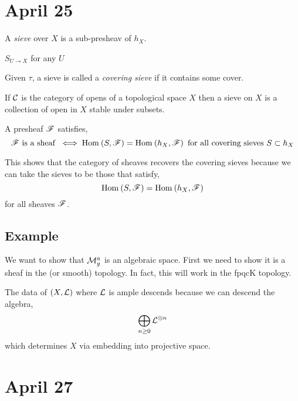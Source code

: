 \documentclass[12pt]{article}
\begin{document}
\section{April 25}

\begin{defn}
A \textit{sieve} over $X$ is a sub-presheav of $h_X$.
\end{defn}

\begin{example}
$S_{U \to X}$ for any $U$
\end{example}

\begin{defn}
Given $\tau$, a sieve is called a \textit{covering sieve} if it contains some cover.
\end{defn}

\begin{example}
If $\mathcal{C}$ is the category of opens of a topological space $X$ then a sieve on $X$ is a collection of open in $X$ stable under subsets. 
\end{example}

\begin{thm}
A presheaf $\mathscr{F}$ satisfies,
\[ \mathscr{F} \text{ is a sheaf } \iff \mathrm{Hom}_{} \left( S, \mathscr{F} \right) = \mathrm{Hom}_{} \left( h_X, \mathscr{F} \right) \text{ for all covering sieves } S \subset h_X \]
\end{thm}

\begin{rmk}
This shows that the category of sheaves recovers the covering sieves because we can take the sieves to be those that satisfy,
\[ \mathrm{Hom}_{} \left( S, \mathscr{F} \right) = \mathrm{Hom}_{} \left( h_X, \mathscr{F} \right) \]
for all sheaves $\mathscr{F}$.
\end{rmk}

\subsection{Example}


We want to show that $\mathcal{M}_g^a$ is an algebraic space. First we need to show it is a sheaf in the \etale (or smooth) topology. In fact, this will work in the fpqcK topology. 

\begin{thm}
The data of $(X, \mathcal{L})$ where $\mathcal{L}$ is ample descends because we can descend the algebra,
\[ \bigoplus_{n \ge 0} \mathcal{L}^{\otimes n} \]
which determines $X$ via embedding into projective space.
\end{thm}

\section{April 27}
\end{document}

